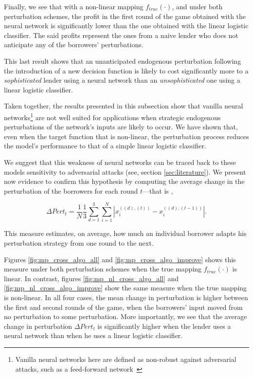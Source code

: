 \documentclass[12pt]{article} %
\begin{document}
Finally, we see that with a non-linear mapping $f_{true}(\cdot)$, and under both perturbation schemes, the profit in the first round of the game obtained with the neural network is significantly lower than the one obtained with the linear logistic classifier. The said profits represent the ones from a naive lender who does not anticipate any of the borrowers' perturbations. 

This last result shows that an unanticipated endogenous perturbation following the introduction of a new decision function is likely to cost significantly more to a \textit{sophisticated} lender using a neural network than an \textit{unsophisticated} one using a linear logistic classifier. 

Taken together, the results presented in this subsection show that vanilla neural networks\footnote{Vanilla neural networks here are defined as non-robust against adversarial attacks, such as a feed-forward network~\citep{goodfellow2014explaining}} are not well suited for applications when strategic endogenous perturbations of the network's inputs are likely to occur. We have shown that, even when the target function that is non-linear, the perturbation process reduces the model's performance to that of a simple linear logistic classifier. 

We suggest that this weakness of neural networks can be traced back to these models sensitivity to adversarial attacks (see, section \ref{sec:literature}). We present now evidence to confirm this hypothesis by computing the average change in the perturbation of the borrowers for each round $t$---that is ,

\begin{equation}\label{equ:pert_change}
\Delta Pert_t = \frac{1}{N} \frac{1}{3}
\sum_{d=1}^{3} \sum_{i=1}^N \left| 
x_i^{\left( (d),(t) \right)}
-
x_i^{\left( (d),(t-1) \right)}
\right|
.
\end{equation}

This measure estimates, on average, how much an individual borrower adapts his perturbation strategy from one round to the next. 

Figures \ref{fig:mp_cross_algo_all} and \ref{fig:mp_cross_algo_improve} shows this measure under both perturbation schemes when the true mapping $f_{true}(\cdot)$ is linear. In contrast, figures \ref{fig:mp_nl_cross_algo_all} and \ref{fig:mp_nl_cross_algo_improve} show the same measure when the true mapping is non-linear. In all four cases, the mean change in perturbation is higher between the first and second rounds of the game, when the borrowers' input moved from no perturbation to some perturbation. More importantly, we see that the average change in perturbation $\Delta Pert_t$ is significantly higher when the lender uses a neural network than when he uses a linear logistic classifier. 
\end{document}
